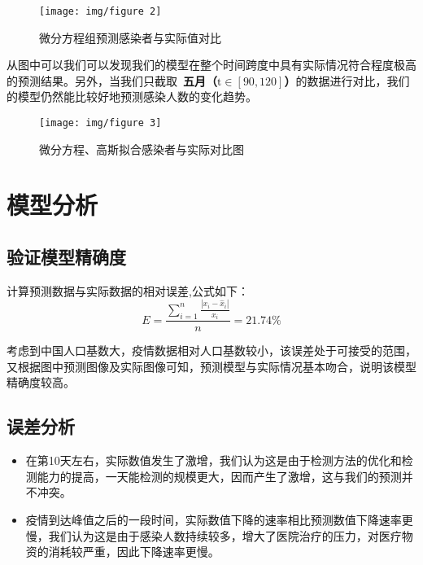 \documentclass[UTF8]{ctexart}
\begin{document}
		\newpage
		\begin{figure}[!htbp]\centering
		\caption{微分方程组预测感染者与实际值对比}
		\texttt{[image: img/figure 2]} %
		\label{fig:figure 2} %
		\end{figure}
		
从图中可以我们可以发现我们的模型在整个时间跨度中具有实际情况符合程度极高的预测结果。另外，当我们只截取\ \textbf{五月（$\mathrm{t}\in[90,120]$）}的数据进行对比，我们的模型仍然能比较好地预测感染人数的变化趋势。		
				
		\begin{figure}[!htbp]\centering
		\caption{微分方程、高斯拟合感染者与实际对比图}
		\texttt{[image: img/figure 3]}
		\label{fig:figure 3}
		\end{figure}
		
	
	\section{模型分析}
	
		\subsection{验证模型精确度}	
		计算预测数据与实际数据的相对误差,公式如下：
		\begin{equation}
		E=\frac{\displaystyle \sum_{i=1}^n\frac{|x_i-\hat{x}_i|}{x_i}}{\displaystyle n}=21.74\%
		\end{equation}
		
		考虑到中国人口基数大，疫情数据相对人口基数较小，该误差处于可接受的范围，又根据图中预测图像及实际图像可知，预测模型与实际情况基本吻合，说明该模型精确度较高。
		
		\subsection{误差分析}

			\begin{itemize}
				\item  在第10天左右，实际数值发生了激增，我们认为这是由于检测方法的优化和检测能力的提高，一天能检测的规模更大，因而产生了激增，这与我们的预测并不冲突。\vspace{-1.3ex}
				\item 疫情到达峰值之后的一段时间，实际数值下降的速率相比预测数值下降速率更慢，我们认为这是由于感染人数持续较多，增大了医院治疗的压力，对医疗物资的消耗较严重，因此下降速率更慢。
			\end{itemize}	
		
\end{document}
